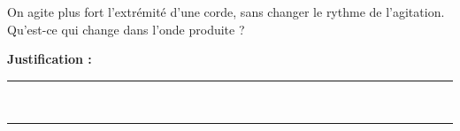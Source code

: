 On agite plus fort l'extrémité d'une corde, sans changer le rythme de l'agitation. Qu'est-ce qui change dans l'onde produite ?

\choices

\noindent\textbf{Justification :} \hrulefill \\[2.5ex]
\rule{\linewidth}{0.4pt} \\[2.5ex]
\rule{\linewidth}{0.4pt}
\vfill
